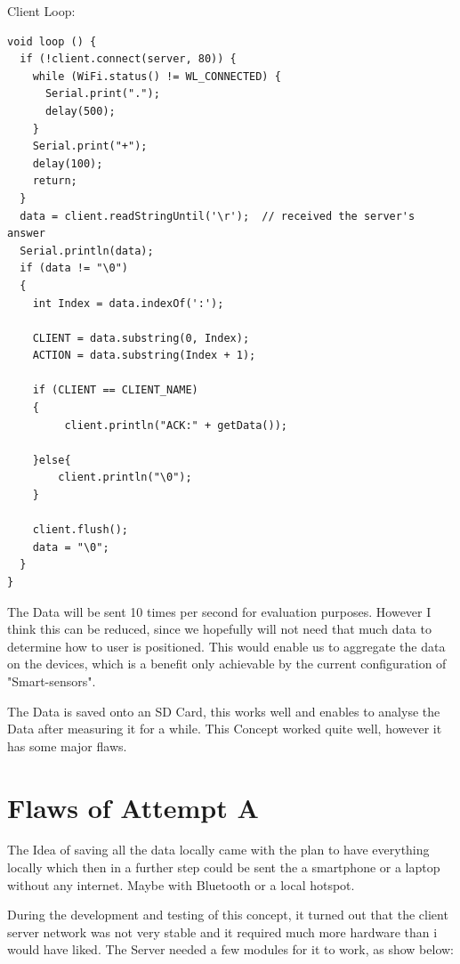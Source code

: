 Client Loop:

\begin{lstlisting}
void loop () {
  if (!client.connect(server, 80)) {
    while (WiFi.status() != WL_CONNECTED) {
      Serial.print(".");
      delay(500);
    }
    Serial.print("+");
    delay(100);
    return;
  }
  data = client.readStringUntil('\r');  // received the server's answer
  Serial.println(data);
  if (data != "\0")
  {
    int Index = data.indexOf(':');

    CLIENT = data.substring(0, Index);
    ACTION = data.substring(Index + 1);

    if (CLIENT == CLIENT_NAME)
    {
         client.println("ACK:" + getData());
      
    }else{
        client.println("\0");
    }

    client.flush();
    data = "\0";
  }
}
\end{lstlisting}

The Data will be sent 10 times per second for evaluation purposes. 
However I think this can be reduced, since we hopefully will not need that much data to determine how to user is positioned. This would enable us to aggregate the data on the devices, which is a benefit only achievable by the current configuration of "Smart-sensors".

The Data is saved onto an SD Card, this works well and enables to analyse the Data after measuring it for a while. This Concept worked quite well, however it has some major flaws. 

\section{Flaws of Attempt A}

The Idea of saving all the data locally came with the plan to have everything locally which then in a further step could be sent the a smartphone or a laptop without any internet. Maybe with Bluetooth or a local hotspot. 

During the development and testing of this concept, it turned out that the client server network was not very stable and it required much more hardware than i would have liked. 
The Server needed a few modules for it to work, as show below:

